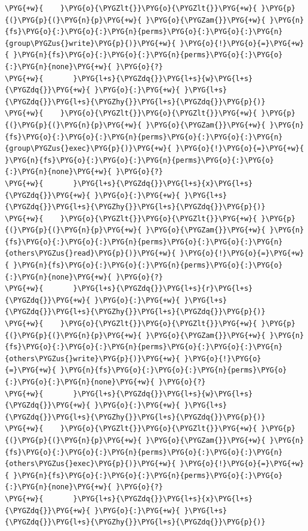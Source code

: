 \begin{itemize}
\begin{codeblockbg}
\begin{Verbatim}[commandchars=\\\{\},breaklines=true,breakanywhere=true,fontsize=\codefont,xleftmargin=17bp]
\PYG{+w}{    }\PYG{o}{\PYGZlt{}}\PYG{o}{\PYGZlt{}}\PYG{+w}{ }\PYG{p}{(}\PYG{p}{(}\PYG{n}{p}\PYG{+w}{ }\PYG{o}{\PYGZam{}}\PYG{+w}{ }\PYG{n}{fs}\PYG{o}{:}\PYG{o}{:}\PYG{n}{perms}\PYG{o}{:}\PYG{o}{:}\PYG{n}{group\PYGZus{}write}\PYG{p}{)}\PYG{+w}{ }\PYG{o}{!}\PYG{o}{=}\PYG{+w}{ }\PYG{n}{fs}\PYG{o}{:}\PYG{o}{:}\PYG{n}{perms}\PYG{o}{:}\PYG{o}{:}\PYG{n}{none}\PYG{+w}{ }\PYG{o}{?}
\PYG{+w}{       }\PYG{l+s}{\PYGZdq{}}\PYG{l+s}{w}\PYG{l+s}{\PYGZdq{}}\PYG{+w}{ }\PYG{o}{:}\PYG{+w}{ }\PYG{l+s}{\PYGZdq{}}\PYG{l+s}{\PYGZhy{}}\PYG{l+s}{\PYGZdq{}}\PYG{p}{)}
\PYG{+w}{    }\PYG{o}{\PYGZlt{}}\PYG{o}{\PYGZlt{}}\PYG{+w}{ }\PYG{p}{(}\PYG{p}{(}\PYG{n}{p}\PYG{+w}{ }\PYG{o}{\PYGZam{}}\PYG{+w}{ }\PYG{n}{fs}\PYG{o}{:}\PYG{o}{:}\PYG{n}{perms}\PYG{o}{:}\PYG{o}{:}\PYG{n}{group\PYGZus{}exec}\PYG{p}{)}\PYG{+w}{ }\PYG{o}{!}\PYG{o}{=}\PYG{+w}{ }\PYG{n}{fs}\PYG{o}{:}\PYG{o}{:}\PYG{n}{perms}\PYG{o}{:}\PYG{o}{:}\PYG{n}{none}\PYG{+w}{ }\PYG{o}{?}
\PYG{+w}{       }\PYG{l+s}{\PYGZdq{}}\PYG{l+s}{x}\PYG{l+s}{\PYGZdq{}}\PYG{+w}{ }\PYG{o}{:}\PYG{+w}{ }\PYG{l+s}{\PYGZdq{}}\PYG{l+s}{\PYGZhy{}}\PYG{l+s}{\PYGZdq{}}\PYG{p}{)}
\PYG{+w}{    }\PYG{o}{\PYGZlt{}}\PYG{o}{\PYGZlt{}}\PYG{+w}{ }\PYG{p}{(}\PYG{p}{(}\PYG{n}{p}\PYG{+w}{ }\PYG{o}{\PYGZam{}}\PYG{+w}{ }\PYG{n}{fs}\PYG{o}{:}\PYG{o}{:}\PYG{n}{perms}\PYG{o}{:}\PYG{o}{:}\PYG{n}{others\PYGZus{}read}\PYG{p}{)}\PYG{+w}{ }\PYG{o}{!}\PYG{o}{=}\PYG{+w}{ }\PYG{n}{fs}\PYG{o}{:}\PYG{o}{:}\PYG{n}{perms}\PYG{o}{:}\PYG{o}{:}\PYG{n}{none}\PYG{+w}{ }\PYG{o}{?}
\PYG{+w}{       }\PYG{l+s}{\PYGZdq{}}\PYG{l+s}{r}\PYG{l+s}{\PYGZdq{}}\PYG{+w}{ }\PYG{o}{:}\PYG{+w}{ }\PYG{l+s}{\PYGZdq{}}\PYG{l+s}{\PYGZhy{}}\PYG{l+s}{\PYGZdq{}}\PYG{p}{)}
\PYG{+w}{    }\PYG{o}{\PYGZlt{}}\PYG{o}{\PYGZlt{}}\PYG{+w}{ }\PYG{p}{(}\PYG{p}{(}\PYG{n}{p}\PYG{+w}{ }\PYG{o}{\PYGZam{}}\PYG{+w}{ }\PYG{n}{fs}\PYG{o}{:}\PYG{o}{:}\PYG{n}{perms}\PYG{o}{:}\PYG{o}{:}\PYG{n}{others\PYGZus{}write}\PYG{p}{)}\PYG{+w}{ }\PYG{o}{!}\PYG{o}{=}\PYG{+w}{ }\PYG{n}{fs}\PYG{o}{:}\PYG{o}{:}\PYG{n}{perms}\PYG{o}{:}\PYG{o}{:}\PYG{n}{none}\PYG{+w}{ }\PYG{o}{?}
\PYG{+w}{       }\PYG{l+s}{\PYGZdq{}}\PYG{l+s}{w}\PYG{l+s}{\PYGZdq{}}\PYG{+w}{ }\PYG{o}{:}\PYG{+w}{ }\PYG{l+s}{\PYGZdq{}}\PYG{l+s}{\PYGZhy{}}\PYG{l+s}{\PYGZdq{}}\PYG{p}{)}
\PYG{+w}{    }\PYG{o}{\PYGZlt{}}\PYG{o}{\PYGZlt{}}\PYG{+w}{ }\PYG{p}{(}\PYG{p}{(}\PYG{n}{p}\PYG{+w}{ }\PYG{o}{\PYGZam{}}\PYG{+w}{ }\PYG{n}{fs}\PYG{o}{:}\PYG{o}{:}\PYG{n}{perms}\PYG{o}{:}\PYG{o}{:}\PYG{n}{others\PYGZus{}exec}\PYG{p}{)}\PYG{+w}{ }\PYG{o}{!}\PYG{o}{=}\PYG{+w}{ }\PYG{n}{fs}\PYG{o}{:}\PYG{o}{:}\PYG{n}{perms}\PYG{o}{:}\PYG{o}{:}\PYG{n}{none}\PYG{+w}{ }\PYG{o}{?}
\PYG{+w}{       }\PYG{l+s}{\PYGZdq{}}\PYG{l+s}{x}\PYG{l+s}{\PYGZdq{}}\PYG{+w}{ }\PYG{o}{:}\PYG{+w}{ }\PYG{l+s}{\PYGZdq{}}\PYG{l+s}{\PYGZhy{}}\PYG{l+s}{\PYGZdq{}}\PYG{p}{)}

\end{Verbatim}
\end{codeblockbg}
\end{itemize}
